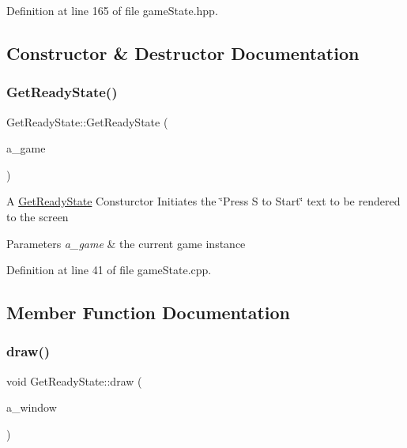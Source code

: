 Definition at line 165 of file game\+State.\+hpp.



\subsection{Constructor \& Destructor Documentation}
\mbox{\label{class_get_ready_state_a227e45622dad03369a88024b54df0e92}} 
\subsubsection{\texorpdfstring{Get\+Ready\+State()}{GetReadyState()}}
{\footnotesize\ttfamily Get\+Ready\+State\+::\+Get\+Ready\+State (\begin{DoxyParamCaption}\item[{\hyperlink{class_game}{Game} $\ast$}]{a\+\_\+game }\end{DoxyParamCaption})}

A \hyperlink{class_get_ready_state}{Get\+Ready\+State} Consturctor Initiates the \char`\"{}\+Press S to Start\char`\"{} text to be rendered to the screen 
\begin{DoxyParams}{Parameters}
{\em a\+\_\+game} & the current game instance \\
\hline
\end{DoxyParams}


Definition at line 41 of file game\+State.\+cpp.



\subsection{Member Function Documentation}
\mbox{\label{class_get_ready_state_a5526ece0f8f8becab78b78fbc7919045}} 
\subsubsection{\texorpdfstring{draw()}{draw()}}
{\footnotesize\ttfamily void Get\+Ready\+State\+::draw (\begin{DoxyParamCaption}\item[{sf\+::\+Render\+Window \&}]{a\+\_\+window }\end{DoxyParamCaption})\hspace{0.3cm}{\ttfamily [virtual]}}

